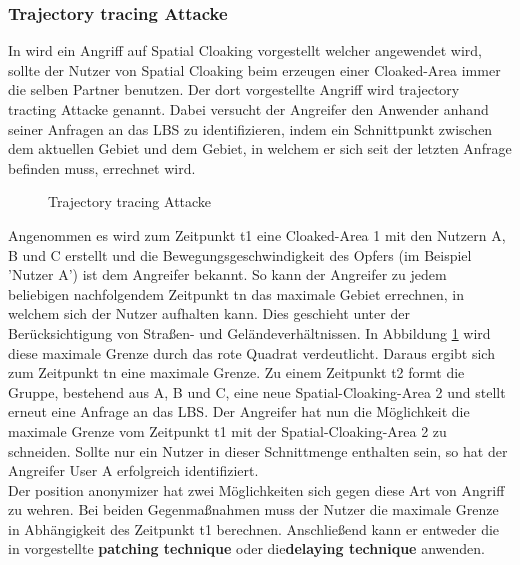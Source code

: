 \subsubsection{Trajectory tracing Attacke} 
In \cite{chow2011} wird ein Angriff auf Spatial Cloaking vorgestellt welcher angewendet wird, sollte der Nutzer von Spatial Cloaking beim erzeugen einer Cloaked-Area immer die selben Partner benutzen. Der dort vorgestellte Angriff wird trajectory tracting Attacke genannt. Dabei versucht der Angreifer den Anwender anhand seiner Anfragen an das LBS zu identifizieren, indem ein Schnittpunkt zwischen dem aktuellen Gebiet und dem Gebiet, in welchem er sich seit der letzten Anfrage befinden muss, errechnet wird. 
\begin{figure}[!h]
		\centering
		\caption{Trajectory tracing Attacke}
		\label{fig_chow2011_traj-tracing-att}
	\end{figure}
Angenommen es wird zum Zeitpunkt t1 eine Cloaked-Area 1 mit den Nutzern A, B und C erstellt und die Bewegungsgeschwindigkeit des Opfers (im Beispiel 'Nutzer A') ist dem Angreifer bekannt. So kann der Angreifer zu jedem beliebigen nachfolgendem Zeitpunkt tn das maximale Gebiet errechnen, in welchem sich der Nutzer aufhalten kann. Dies geschieht unter der Berücksichtigung von Straßen- und Geländeverhältnissen. In Abbildung \ref{fig_chow2011_traj-tracing-att} wird diese maximale Grenze durch das rote Quadrat verdeutlicht. Daraus ergibt sich zum Zeitpunkt tn eine maximale Grenze. Zu einem Zeitpunkt t2 formt die Gruppe, bestehend aus A, B und C, eine neue Spatial-Cloaking-Area 2 und stellt erneut eine Anfrage an das LBS. Der Angreifer hat nun die Möglichkeit die maximale Grenze vom Zeitpunkt t1 mit der Spatial-Cloaking-Area 2 zu schneiden. Sollte nur ein Nutzer in dieser Schnittmenge enthalten sein, so hat der Angreifer User A erfolgreich identifiziert.\\  Der position anonymizer hat zwei Möglichkeiten sich gegen diese Art von Angriff zu wehren. Bei beiden Gegenmaßnahmen muss der Nutzer die maximale Grenze in Abhängigkeit des Zeitpunkt t1 berechnen. Anschließend kann er entweder die in \cite{Chow2011} vorgestellte \textbf{patching technique} oder die\textbf{delaying technique} anwenden. 
